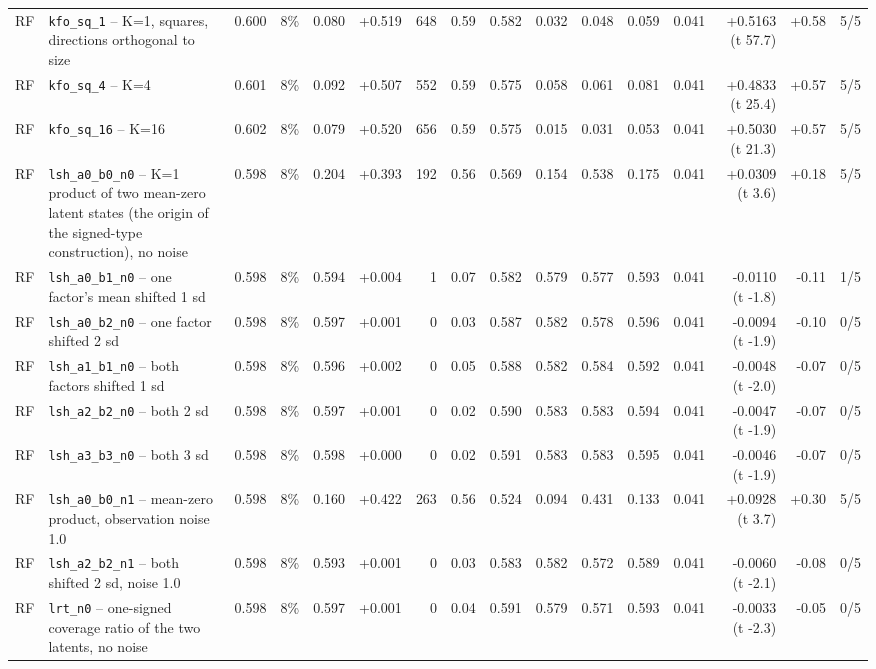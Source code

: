 \begin{landscape}
\begin{longtable}{lp{4.6cm}rrrrrrrrrrrrrr}
RF & \texttt{kfo\_sq\_1} -- K=1, squares, directions orthogonal to size & 0.600 & 8\% & 0.080 & +0.519 & 648 & 0.59 & 0.582 & 0.032 & 0.048 & 0.059 & 0.041 & +0.5163 (t 57.7) & +0.58 & 5/5 \\
RF & \texttt{kfo\_sq\_4} -- K=4 & 0.601 & 8\% & 0.092 & +0.507 & 552 & 0.59 & 0.575 & 0.058 & 0.061 & 0.081 & 0.041 & +0.4833 (t 25.4) & +0.57 & 5/5 \\
RF & \texttt{kfo\_sq\_16} -- K=16 & 0.602 & 8\% & 0.079 & +0.520 & 656 & 0.59 & 0.575 & 0.015 & 0.031 & 0.053 & 0.041 & +0.5030 (t 21.3) & +0.57 & 5/5 \\
RF & \texttt{lsh\_a0\_b0\_n0} -- K=1 product of two mean-zero latent states (the origin of the signed-type construction), no noise & 0.598 & 8\% & 0.204 & +0.393 & 192 & 0.56 & 0.569 & 0.154 & 0.538 & 0.175 & 0.041 & +0.0309 (t 3.6) & +0.18 & 5/5 \\
RF & \texttt{lsh\_a0\_b1\_n0} -- one factor's mean shifted 1 sd & 0.598 & 8\% & 0.594 & +0.004 & 1 & 0.07 & 0.582 & 0.579 & 0.577 & 0.593 & 0.041 & -0.0110 (t -1.8) & -0.11 & 1/5 \\
RF & \texttt{lsh\_a0\_b2\_n0} -- one factor shifted 2 sd & 0.598 & 8\% & 0.597 & +0.001 & 0 & 0.03 & 0.587 & 0.582 & 0.578 & 0.596 & 0.041 & -0.0094 (t -1.9) & -0.10 & 0/5 \\
RF & \texttt{lsh\_a1\_b1\_n0} -- both factors shifted 1 sd & 0.598 & 8\% & 0.596 & +0.002 & 0 & 0.05 & 0.588 & 0.582 & 0.584 & 0.592 & 0.041 & -0.0048 (t -2.0) & -0.07 & 0/5 \\
RF & \texttt{lsh\_a2\_b2\_n0} -- both 2 sd & 0.598 & 8\% & 0.597 & +0.001 & 0 & 0.02 & 0.590 & 0.583 & 0.583 & 0.594 & 0.041 & -0.0047 (t -1.9) & -0.07 & 0/5 \\
RF & \texttt{lsh\_a3\_b3\_n0} -- both 3 sd & 0.598 & 8\% & 0.598 & +0.000 & 0 & 0.02 & 0.591 & 0.583 & 0.583 & 0.595 & 0.041 & -0.0046 (t -1.9) & -0.07 & 0/5 \\
RF & \texttt{lsh\_a0\_b0\_n1} -- mean-zero product, observation noise 1.0 & 0.598 & 8\% & 0.160 & +0.422 & 263 & 0.56 & 0.524 & 0.094 & 0.431 & 0.133 & 0.041 & +0.0928 (t 3.7) & +0.30 & 5/5 \\
RF & \texttt{lsh\_a2\_b2\_n1} -- both shifted 2 sd, noise 1.0 & 0.598 & 8\% & 0.593 & +0.001 & 0 & 0.03 & 0.583 & 0.582 & 0.572 & 0.589 & 0.041 & -0.0060 (t -2.1) & -0.08 & 0/5 \\
RF & \texttt{lrt\_n0} -- one-signed coverage ratio of the two latents, no noise & 0.598 & 8\% & 0.597 & +0.001 & 0 & 0.04 & 0.591 & 0.579 & 0.571 & 0.593 & 0.041 & -0.0033 (t -2.3) & -0.05 & 0/5 \\

\end{longtable}
\end{landscape}
